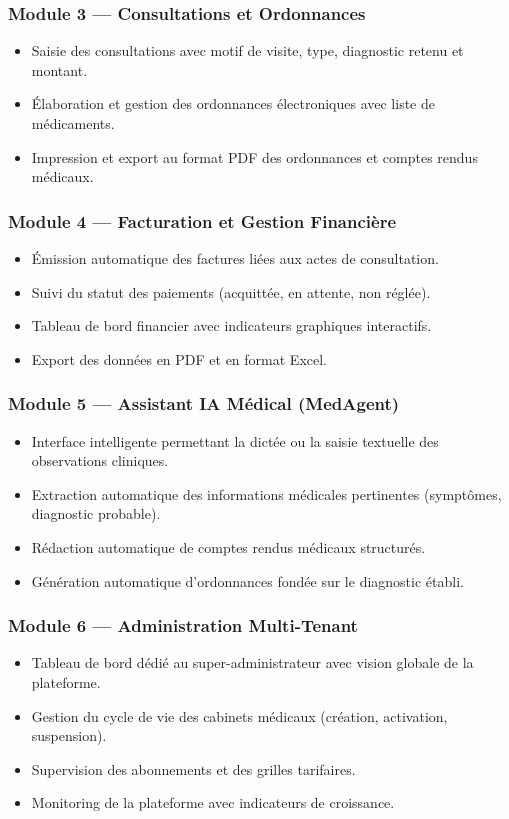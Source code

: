 \subsubsection*{Module 3 — Consultations et Ordonnances}
\begin{itemize}
  \item Saisie des consultations avec motif de visite, type, diagnostic retenu et montant.
  \item Élaboration et gestion des ordonnances électroniques avec liste de médicaments.
  \item Impression et export au format PDF des ordonnances et comptes rendus médicaux.
\end{itemize}

\subsubsection*{Module 4 — Facturation et Gestion Financière}
\begin{itemize}
  \item Émission automatique des factures liées aux actes de consultation.
  \item Suivi du statut des paiements (acquittée, en attente, non réglée).
  \item Tableau de bord financier avec indicateurs graphiques interactifs.
  \item Export des données en PDF et en format Excel.
\end{itemize}

\subsubsection*{Module 5 — Assistant IA Médical (MedAgent)}
\begin{itemize}
  \item Interface intelligente permettant la dictée ou la saisie textuelle des
    observations cliniques.
  \item Extraction automatique des informations médicales pertinentes (symptômes,
    diagnostic probable).
  \item Rédaction automatique de comptes rendus médicaux structurés.
  \item Génération automatique d'ordonnances fondée sur le diagnostic établi.
\end{itemize}

\subsubsection*{Module 6 — Administration Multi-Tenant}
\begin{itemize}
  \item Tableau de bord dédié au super-administrateur avec vision globale de
    la plateforme.
  \item Gestion du cycle de vie des cabinets médicaux (création, activation,
    suspension).
  \item Supervision des abonnements et des grilles tarifaires.
  \item Monitoring de la plateforme avec indicateurs de croissance.
\end{itemize}


